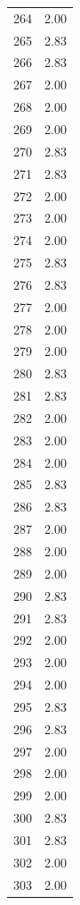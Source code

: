 \documentclass[a4paper,11pt]{article}
\begin{document}
\begin{center}
\begin{longtable}{|R{1.5cm}|R{2.5cm}|}
  264  &         2.00 \\ 
  265  &         2.83 \\ 
  266  &         2.83 \\ 
  267  &         2.00 \\ 
  268  &         2.00 \\ 
  269  &         2.00 \\ 
  270  &         2.83 \\ 
  271  &         2.83 \\ 
  272  &         2.00 \\ 
  273  &         2.00 \\ 
  274  &         2.00 \\ 
  275  &         2.83 \\ 
  276  &         2.83 \\ 
  277  &         2.00 \\ 
  278  &         2.00 \\ 
  279  &         2.00 \\ 
  280  &         2.83 \\ 
  281  &         2.83 \\ 
  282  &         2.00 \\ 
  283  &         2.00 \\ 
  284  &         2.00 \\ 
  285  &         2.83 \\ 
  286  &         2.83 \\ 
  287  &         2.00 \\ 
  288  &         2.00 \\ 
  289  &         2.00 \\ 
  290  &         2.83 \\ 
  291  &         2.83 \\ 
  292  &         2.00 \\ 
  293  &         2.00 \\ 
  294  &         2.00 \\ 
  295  &         2.83 \\ 
  296  &         2.83 \\ 
  297  &         2.00 \\ 
  298  &         2.00 \\ 
  299  &         2.00 \\ 
  300  &         2.83 \\ 
  301  &         2.83 \\ 
  302  &         2.00 \\ 
  303  &         2.00 \\ 

\end{longtable}
\end{center}
\end{document}
